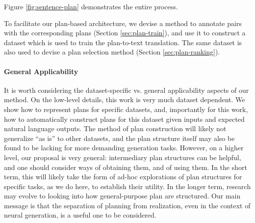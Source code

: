 \documentclass[11pt,a4paper]{article}
\begin{document}
\begin{figure*}[t]
    \caption{Summary of our proposed generation process: the planner takes the input RDF triplets in (a), and generates the explicit plan in (b). The plan is then linearized (c) and passed to a neural generation system, producing the output (d).}
    \label{fig:sentence-plan}
    
\end{figure*} Figure \ref{fig:sentence-plan} demonstrates the entire process.

To facilitate our plan-based architecture, we devise a method to annotate  pairs with the corresponding plans (Section \ref{sec:plan-train}), and use it to construct a dataset which is used to train the plan-to-text translation. The same dataset is also used to devise a plan selection method (Section \ref{sec:plan-ranking}).

\paragraph{General Applicability}
It is worth considering the dataset-specific vs. general applicability aspects of  our method. On the low-level details, this work is very much dataset dependent. We show how to represent plans for specific datasets, and, importantly for this work, how to automatically construct plans for this dataset given inputs and expected natural language outputs. The method of plan construction will likely not generalize ``as is'' to other datasets, and the plan structure itself may also be found to be lacking for more demanding generation tasks. However, on a higher level, our proposal is very general: intermediary plan structures can be helpful, and one should consider ways of obtaining them, and of using them. In the short term, this will likely take the form of ad-hoc explorations of plan structures for specific tasks, as we do here, to establish their utility. In the longer term, research may evolve to looking into how general-purpose plan are structured. Our main message is that the separation of planning from realization, even in the context of neural generation, is a useful one to be considered.
\end{document}
